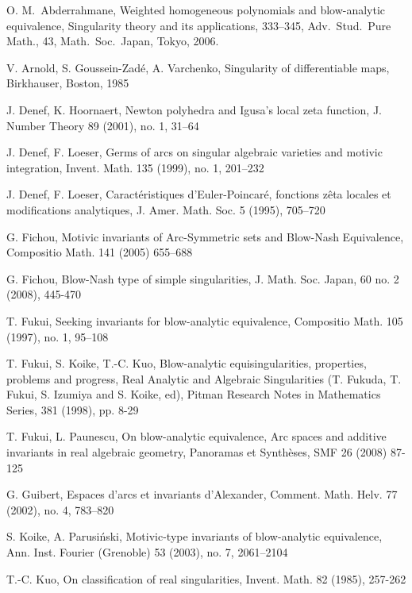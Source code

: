 \documentclass[12pt,a4paper,leqno]{amsart}
\theoremstyle{definition}
\begin{document}
\begin{thebibliography}{99}

O. M.~Abderrahmane,
Weighted homogeneous polynomials and blow-analytic equivalence,
Singularity theory and its applications, 333--345, 
Adv.~Stud.~Pure Math., 43, Math.~Soc.~Japan, Tokyo, 2006.

 V. Arnold, S. Goussein-Zad\'e, A. Varchenko,
Singularity of differentiable maps, 
Birkhauser, Boston, 1985

 J. Denef, K. Hoornaert, 
Newton polyhedra and Igusa's local zeta function,
J. Number Theory  89  (2001),  no. 1, 31--64

 J. Denef, F. Loeser,
Germs of arcs on singular algebraic varieties and motivic integration,
Invent. Math.  135  (1999),  no. 1, 201--232

 J. Denef, F. Loeser,
Caract\'eristiques d'Euler-Poincar\'e, fonctions z\^eta locales et
modifications analytiques,
J. Amer. Math. Soc. 5 (1995), 705--720

 G. Fichou,
Motivic invariants of Arc-Symmetric sets and Blow-Nash Equivalence, 
Compositio Math. 141 (2005) 655--688 

 G. Fichou,
Blow-Nash type of simple singularities,
J. Math. Soc. Japan, 60 no. 2 (2008), 445-470 

 T. Fukui, 
Seeking invariants for blow-analytic equivalence, 
Compositio Math.  105  (1997),  no. 1, 95--108

  T. Fukui, S. Koike, T.-C. Kuo, 
Blow-analytic equisingularities, properties, problems and progress, 
Real Analytic and Algebraic Singularities (T. Fukuda, T. Fukui,
S. Izumiya and S. Koike, ed), Pitman Research Notes in Mathematics Series, 381 (1998), pp. 8-29

 T. Fukui, L. Paunescu, 
On blow-analytic equivalence, 
Arc spaces and additive invariants in real algebraic geometry,
Panoramas et Synth\`eses, SMF 26 (2008) 87-125

 G. Guibert, 
Espaces d'arcs et invariants d'Alexander, 
Comment. Math. Helv.  77  (2002),  no. 4, 783--820

 S. Koike, A. Parusi\'nski, 
Motivic-type invariants of blow-analytic equivalence,  
Ann. Inst. Fourier (Grenoble)  53  (2003),  no. 7, 2061--2104

 T.-C. Kuo, 
On classification of real singularities,
Invent. Math. 82 (1985), 257-262


\end{thebibliography}
\end{document}

